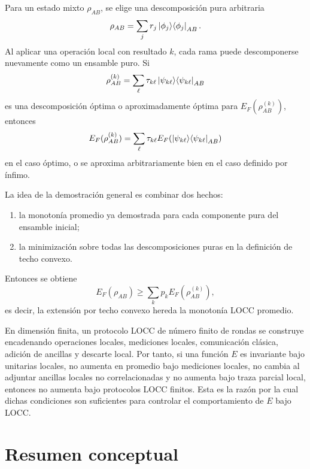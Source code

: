 \documentclass[../main.tex]{subfiles}
\begin{document}
Para un estado mixto \(\rho_{AB}\), se elige una descomposición pura arbitraria
\begin{equation*}
    \rho_{AB}=\sum_j r_j\ket{\phi_j}\!\bra{\phi_j}_{AB}.
\end{equation*}
Al aplicar una operación local con resultado \(k\), cada rama puede descomponerse nuevamente como un ensamble puro. Si
\begin{equation*}
    \rho_{AB}^{(k)}=\sum_\ell \tau_{k\ell}\ket{\psi_{k\ell}}\!\bra{\psi_{k\ell}}_{AB}
\end{equation*}
es una descomposición óptima o aproximadamente óptima para \(E_F(\rho_{AB}^{(k)})\), entonces
\begin{equation*}
    E_F(\rho_{AB}^{(k)})
    =
    \sum_\ell \tau_{k\ell}E_F(\ket{\psi_{k\ell}}\!\bra{\psi_{k\ell}}_{AB})
\end{equation*}
en el caso óptimo, o se aproxima arbitrariamente bien en el caso definido por ínfimo.

La idea de la demostración general es combinar dos hechos:
\begin{enumerate}
    \item la monotonía promedio ya demostrada para cada componente pura del ensamble inicial;
    \item la minimización sobre todas las descomposiciones puras en la definición de techo convexo.
\end{enumerate}
Entonces se obtiene
\begin{equation}
    E_F(\rho_{AB})
    \geq
    \sum_k p_k E_F(\rho_{AB}^{(k)}),
    \label{eq:monotonia-mixtos-techo-convexo}
\end{equation}
es decir, la extensión por techo convexo hereda la monotonía LOCC promedio.

\begin{observacion}
En dimensión finita, un protocolo LOCC de número finito de rondas se construye encadenando operaciones locales, mediciones locales, comunicación clásica, adición de ancillas y descarte local. Por tanto, si una función \(E\) es invariante bajo unitarias locales, no aumenta en promedio bajo mediciones locales, no cambia al adjuntar ancillas locales no correlacionadas y no aumenta bajo traza parcial local, entonces no aumenta bajo protocolos LOCC finitos. Esta es la razón por la cual dichas condiciones son suficientes para controlar el comportamiento de \(E\) bajo LOCC.
\end{observacion}

\section{Resumen conceptual}
\end{document}

